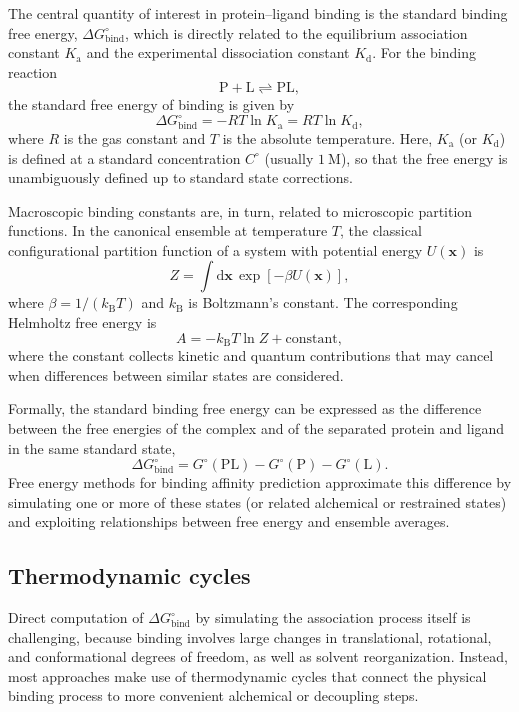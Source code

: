 \documentclass[12pt]{article}
\begin{document}
The central quantity of interest in protein--ligand binding is the standard binding free energy, \(\Delta G^\circ_\mathrm{bind}\), which is directly related to the equilibrium association constant \(K_\mathrm{a}\) and the experimental dissociation constant \(K_\mathrm{d}\). 
For the binding reaction
\[
\mathrm{P} + \mathrm{L} \rightleftharpoons \mathrm{PL},
\]
the standard free energy of binding is given by
\[
\Delta G^\circ_\mathrm{bind} = -RT \ln K_\mathrm{a} = RT \ln K_\mathrm{d}, 
\]
where \(R\) is the gas constant and \(T\) is the absolute temperature. 
Here, \(K_\mathrm{a}\) (or \(K_\mathrm{d}\)) is defined at a standard concentration \(C^\circ\) (usually \(1\ \mathrm{M}\)), so that the free energy is unambiguously defined up to standard state corrections. 

Macroscopic binding constants are, in turn, related to microscopic partition functions.
In the canonical ensemble at temperature \(T\), the classical configurational partition function of a system with potential energy \(U(\mathbf{x})\) is
\[
Z = \int \mathrm{d}\mathbf{x}\, \exp[-\beta U(\mathbf{x})],
\]
where \(\beta = 1/(k_\mathrm{B}T)\) and \(k_\mathrm{B}\) is Boltzmann's constant. 
The corresponding Helmholtz free energy is
\[
A = -k_\mathrm{B} T \ln Z + \text{constant},
\]
where the constant collects kinetic and quantum contributions that may cancel when differences between similar states are considered.\cite{CH10_zwanzig1954high,CH10_chipot2007free} 

Formally, the standard binding free energy can be expressed as the difference between the free energies of the complex and of the separated protein and ligand in the same standard state,
\[
\Delta G^\circ_\mathrm{bind} 
= G^\circ(\mathrm{PL}) - G^\circ(\mathrm{P}) - G^\circ(\mathrm{L}). 
\]
Free energy methods for binding affinity prediction approximate this difference by simulating one or more of these states (or related alchemical or restrained states) and exploiting relationships between free energy and ensemble averages. 

\subsection{Thermodynamic cycles}

Direct computation of \(\Delta G^\circ_\mathrm{bind}\) by simulating the association process itself is challenging, because binding involves large changes in translational, rotational, and conformational degrees of freedom, as well as solvent reorganization. 
Instead, most approaches make use of thermodynamic cycles that connect the physical binding process to more convenient alchemical or decoupling steps. 
\end{document}

